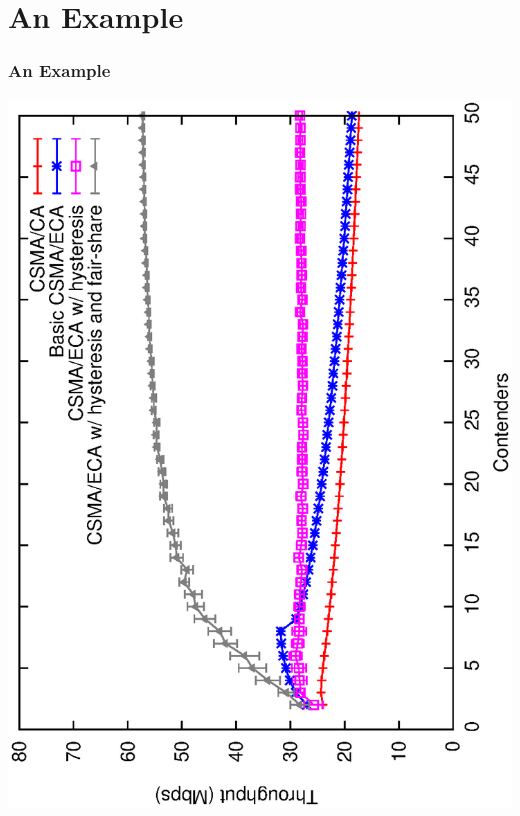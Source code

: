 \documentclass{beamer}
\begin{document}
\section{An Example}
\begin{frame}
  \frametitle{An Example}
      \begin{center}
        \includegraphics[angle=-90,width=\textwidth]{figures/throughput-combined}
      \end{center}
\end{frame}
\end{document}
